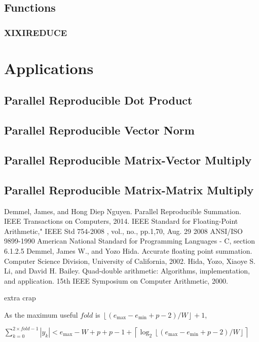 \documentclass[12pt]{article}
\providecommand{\ceil}[1]{\left \lceil #1 \right \rceil }
\providecommand{\floor}[1]{\left \lfloor #1 \right \rfloor }
\providecommand{\min}{\ensuremath{\text{min}}}
\providecommand{\max}{\ensuremath{\text{max}}}
\theoremstyle{plain}
\begin{document}
  \subsection{Functions}
    \subsubsection{XIXIREDUCE}
\section{Applications}
  \subsection{Parallel Reproducible Dot Product}
  \subsection{Parallel Reproducible Vector Norm}
  \subsection{Parallel Reproducible Matrix-Vector Multiply}
  \subsection{Parallel Reproducible Matrix-Matrix Multiply}
\begin{thebibliography}{9}
    Demmel, James, and Hong Diep Nguyen. Parallel Reproducible Summation. IEEE Transactions on Computers, 2014.
    IEEE Standard for Floating-Point Arithmetic," IEEE Std 754-2008 , vol., no., pp.1,70, Aug. 29 2008
    ANSI/ISO 9899-1990 American National Standard for Programming Languages - C, section 6.1.2.5
    Demmel, James W., and Yozo Hida. Accurate floating point summation. Computer Science Division, University of California, 2002.
    Hida, Yozo, Xiaoye S. Li, and David H. Bailey. Quad-double arithmetic: Algorithms, implementation, and application. 15th IEEE Symposium on Computer Arithmetic, 2000.
\end{thebibliography}
extra crap

    As the maximum useful $fold$ is $\floor{(e_{\max} - e_{\min} + p - 2)/W} + 1$,

    $\sum_{k = 0}^{2 \times fold - 1} |y_k| < e_{\max} - W + p + p - 1 + \ceil{\log_2{\floor{(e_{\max} - e_{\min} + p - 2)/W}}}$
\end{document}
